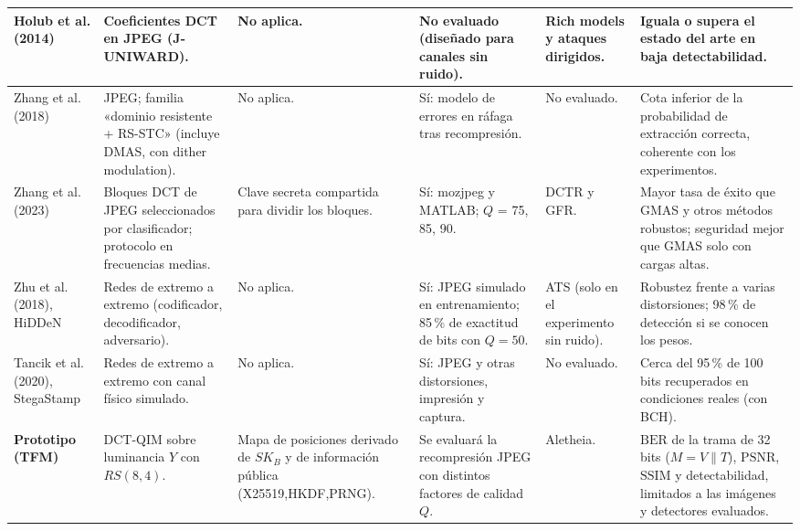 \documentclass[IB]{TFUOC}%
\begin{document}
\begin{table}[H]
\begin{tabular}{|p{2.1cm}|p{2.2cm}|p{2.1cm}|p{2.5cm}|p{2.3cm}|p{3.2cm}|}
Holub et al. (2014) \cite{17} &
Coeficientes DCT en JPEG (J-UNIWARD). &
No aplica. &
No evaluado (diseñado para canales sin ruido). &
Rich models y ataques dirigidos. &
Iguala o supera el estado del arte en baja detectabilidad. \\
\hline

Zhang et al. (2018) \cite{20} &
JPEG; familia «dominio resistente + RS-STC» (incluye DMAS, con dither modulation). &
No aplica. &
Sí: modelo de errores en ráfaga tras recompresión. &
No evaluado. &
Cota inferior de la probabilidad de extracción correcta, coherente con los experimentos. \\
\hline

Zhang et al. (2023) \cite{18} &
Bloques DCT de JPEG seleccionados por clasificador; protocolo en frecuencias medias. &
Clave secreta compartida para dividir los bloques. &
Sí: mozjpeg y MATLAB; $Q$ = 75, 85, 90. &
DCTR y GFR. &
Mayor tasa de éxito que GMAS y otros métodos robustos; seguridad mejor que GMAS solo con cargas altas. \\
\hline

Zhu et al. (2018), HiDDeN \cite{zhu2018hidden} &
Redes de extremo a extremo (codificador, decodificador, adversario). &
No aplica. &
Sí: JPEG simulado en entrenamiento; 85\,\% de exactitud de bits con $Q=50$. &
ATS \cite{lerch2016ats} (solo en el experimento sin ruido). &
Robustez frente a varias distorsiones; 98\,\% de detección si se conocen los pesos. \\
\hline

Tancik et al. (2020), StegaStamp \cite{tancik2020stegastamp} &
Redes de extremo a extremo con canal físico simulado. &
No aplica. &
Sí: JPEG y otras distorsiones, impresión y captura. &
No evaluado. &
Cerca del 95\,\% de 100 bits recuperados en condiciones reales (con BCH). \\
\hline

\textbf{Prototipo (TFM)} &
DCT-QIM sobre luminancia $Y$ con $RS(8,4)$. &
Mapa de posiciones derivado de $SK_B$ y de información pública (X25519,HKDF,PRNG). &
Se evaluará la recompresión JPEG con distintos factores de calidad $Q$. &
Aletheia. &
$\mathrm{BER}$ de la trama de 32 bits ($M=V\parallel T$), $\mathrm{PSNR}$, $\mathrm{SSIM}$ y detectabilidad, limitados a las imágenes y detectores evaluados. \\
\hline
\end{tabular}
\end{table}

\end{document}
